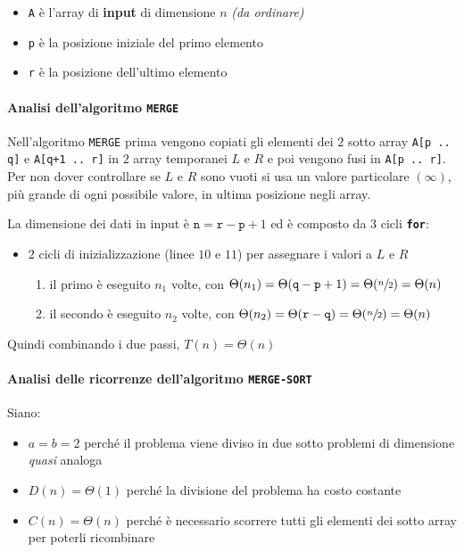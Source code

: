 \documentclass[italian, 10pt]{article}
\begin{document}
\begin{itemize}
  \item \texttt{A} è l'array di \textbf{input} di dimensione \(n\) \textit{(da ordinare)}
  \item \texttt{p} è la posizione iniziale del primo elemento
  \item \texttt{r} è la posizione dell'ultimo elemento
\end{itemize}

\paragraph{Analisi dell'algoritmo \texttt{MERGE}}

Nell'algoritmo \texttt{MERGE} prima vengono copiati gli elementi dei \(2\) sotto array \texttt{A[p .. q]} e \texttt{A[q+1 .. r]} in \(2\) array temporanei \(L\) e \(R\) e poi vengono fusi in \texttt{A[p .. r]}.
Per non dover controllare se \(L\) e \(R\) sono vuoti si usa un valore particolare \((\infty)\), più grande di ogni possibile valore, in ultima posizione negli array.

La dimensione dei dati in input è \(\texttt{n} = \texttt{r} - \texttt{p} + 1\) ed è composto da \(3\) cicli \textbf{\texttt{for}}:

\begin{itemize}
  \item \(2\) cicli di inizializzazione (linee \(10\) e \(11\)) per assegnare i valori a \(L\) e \(R\)
        \begin{enumerate}
          \item il primo è eseguito \(n_1\) volte, con \(\Theta(n_1) = \Theta(\texttt{q}-\texttt{p}+1) = \Theta(\sfrac{n}{2}) = \Theta(n)\)
          \item il secondo è eseguito \(n_2\) volte, con \(\Theta(n_2) = \Theta(\texttt{r}-\texttt{q}) = \Theta(\sfrac{n}{2}) = \Theta(n)\)
        \end{enumerate}
\end{itemize}
Quindi combinando i due passi, \(T(n) = \Theta(n)\)

\paragraph{Analisi delle ricorrenze dell'algoritmo \texttt{MERGE-SORT}}

Siano:

\begin{itemize}
  \item \(a = b = 2\) perché il problema viene diviso in due sotto problemi di dimensione \textit{quasi} analoga
  \item \(D(n) = \Theta(1)\) perché la divisione del problema ha costo costante
  \item \(C(n) = \Theta(n)\) perché è necessario scorrere tutti gli elementi dei sotto array per poterli ricombinare
\end{itemize}
\end{document}
